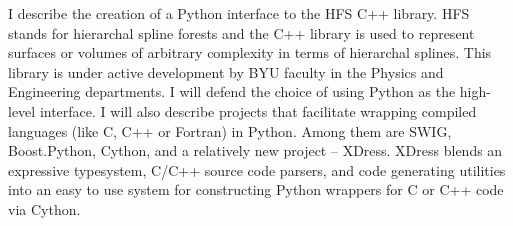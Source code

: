 I describe the creation of a Python interface to the HFS C++ library. HFS stands for hierarchal spline forests and the C++ library is used to represent surfaces or volumes of arbitrary complexity in terms of hierarchal splines. This library is under active development by BYU faculty in the Physics and Engineering departments. I will defend the choice of using Python as the high-level interface. I will also describe projects that facilitate wrapping compiled languages (like C, C++ or Fortran) in Python. Among them are SWIG, Boost.Python, Cython, and a relatively new project -- XDress. XDress blends an expressive typesystem, C/C++ source code parsers, and code generating utilities into an easy to use system for constructing Python wrappers for C or C++ code via Cython.

